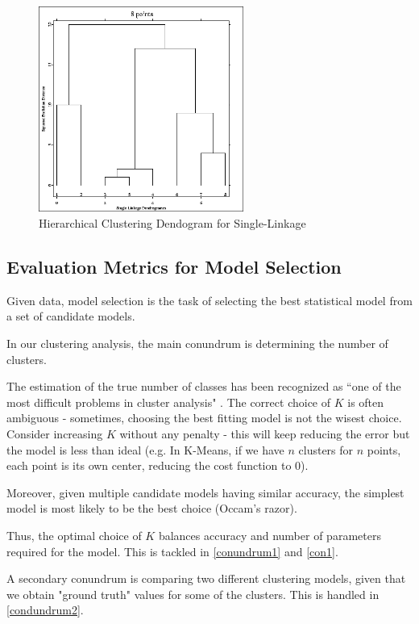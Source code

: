 \begin{figure}
    \centering
    \includegraphics[width=0.6\textwidth]{Figures/hier.png}
    \caption{Hierarchical Clustering Dendogram for Single-Linkage}
    \label{fig:HC}
\end{figure}
\subsection{Evaluation Metrics for Model Selection}

Given data, model selection is the task of selecting the best statistical model from a set of candidate models. 

In our clustering analysis, the main conundrum is determining the number of clusters.

The estimation of the true number of classes has been recognized as “one of the most difficult problems in cluster analysis" \cite{bock1996probabilistic}. The correct choice of $K$ is often ambiguous - sometimes, choosing the best fitting model is not the wisest choice. Consider increasing $K$ without any penalty - this will keep reducing the error but the model is less than ideal (e.g. In K-Means, if we have $n$ clusters for $n$ points, each point is its own center, reducing the cost function to 0). 

Moreover, given multiple candidate models having similar accuracy, the simplest model is most likely to be the best choice (Occam's razor).

Thus, the optimal choice of $K$ balances accuracy and number of parameters required for the model. This is tackled in \ref{conundrum1} and \ref{con1}.

A secondary conundrum is comparing two different clustering models, given that we obtain "ground truth" values for some of the clusters. This is handled in \ref{condundrum2}. 
